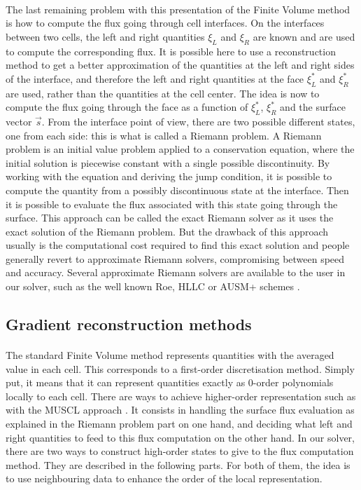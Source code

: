       \paragraph{}
      The last remaining problem with this presentation of the Finite Volume method is how to compute the flux going through cell interfaces.
      On the interfaces between two cells, the left and right quantities $\xi_L$ and $\xi_R$ are known and are used to compute the corresponding flux.
      It is possible here to use a reconstruction method to get a better approximation of the quantities at the left and right sides of the interface, and therefore the left and right quantities at the face $\xi_L^*$ and $\xi_R^*$ are used, rather than the quantities at the cell center.
      The idea is now to compute the flux going through the face as a function of $\xi_L^*$, $\xi_R^*$ and the surface vector $\vec{s}$.
      From the interface point of view, there are two possible different states, one from each side: this is what is called a Riemann problem.
      A Riemann problem is an initial value problem applied to a conservation equation, where the initial solution is piecewise constant with a single possible discontinuity.
      By working with the equation and deriving the jump condition, it is possible to compute the quantity from a possibly discontinuous state at the interface.
      Then it is possible to evaluate the flux associated with this state going through the surface.
      This approach can be called the exact Riemann solver as it uses the exact solution of the Riemann problem.
      But the drawback of this approach usually is the computational cost required to find this exact solution and people generally revert to approximate Riemann solvers, compromising between speed and accuracy.
      Several approximate Riemann solvers are available to the user in our solver, such as the well known Roe, HLLC or AUSM+ schemes \cite{Roe1981, Toro2009}.


    \subsection{Gradient reconstruction methods}

      \paragraph{}
      The standard Finite Volume method represents quantities with the averaged value in each cell.
      This corresponds to a first-order discretisation method.
      Simply put, it means that it can represent quantities exactly as 0-order polynomials locally to each cell.
      There are ways to achieve higher-order representation such as with the MUSCL approach \cite{VanLeer1979}.
      It consists in handling the surface flux evaluation as explained in the Riemann problem part on one hand, and deciding what left and right quantities to feed to this flux computation on the other hand.
      In our solver, there are two ways to construct high-order states to give to the flux computation method.
      They are described in the following parts.
      For both of them, the idea is to use neighbouring data to enhance the order of the local representation.


